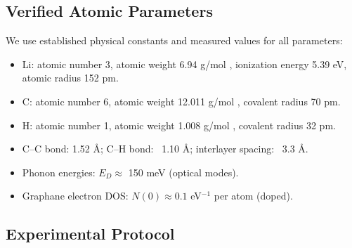 \documentclass[11pt,a4paper]{article}
\begin{document}
\subsection{Verified Atomic Parameters}
\label{subsec:verified_atomic_parameters_detailed}
We use established physical constants and measured values for all parameters:
\begin{itemize}
\item Li: atomic number 3, atomic weight 6.94  g/mol , ionization energy 5.39 eV, atomic radius 152 pm.
\item C: atomic number 6, atomic weight 12.011  g/mol , covalent radius 70 pm.
\item H: atomic number 1, atomic weight 1.008  g/mol , covalent radius 32 pm.
\item C–C bond: 1.52 Å; C–H bond: ~1.10 Å; interlayer spacing: ~3.3 Å.
\item Phonon energies: $E_D \approx$ 150 meV (optical modes).
\item Graphane electron DOS: $N(0) \approx 0.1$ eV$^{-1}$ per atom (doped).
\end{itemize}

\subsection{Experimental Protocol}
\label{subsec:experimental_protocol_detailed}
\end{document}
